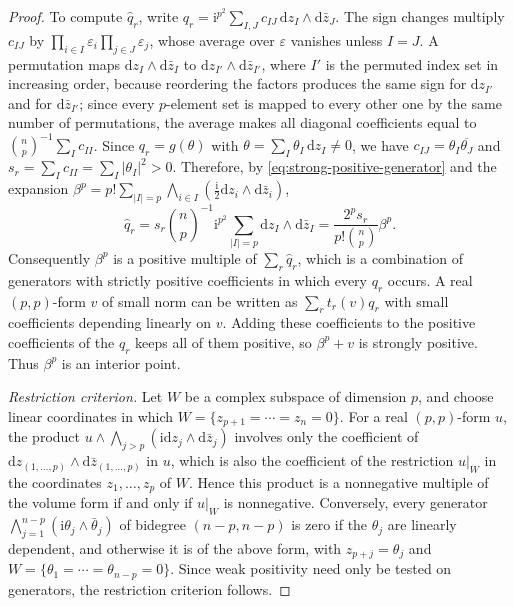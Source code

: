 \begin{proof}
To compute $\widehat q_r$, write $q_r=\mathrm i^{p^2}\sum_{I,J}c_{IJ}\,\mathrm dz_I\wedge\mathrm d\bar z_J$. The sign changes multiply $c_{IJ}$ by $\prod_{i\in I}\varepsilon_i\prod_{j\in J}\varepsilon_j$, whose average over $\varepsilon$ vanishes unless $I=J$. A permutation maps $\mathrm dz_I\wedge\mathrm d\bar z_I$ to $\mathrm dz_{I'}\wedge\mathrm d\bar z_{I'}$, where $I'$ is the permuted index set in increasing order, because reordering the factors produces the same sign for $\mathrm dz_{I'}$ and for $\mathrm d\bar z_{I'}$; since every $p$-element set is mapped to every other one by the same number of permutations, the average makes all diagonal coefficients equal to $\binom np^{-1}\sum_Ic_{II}$. Since $q_r=g(\theta)$ with $\theta=\sum_I\theta_I\,\mathrm dz_I\neq0$, we have $c_{IJ}=\theta_I\overline{\theta_J}$ and $s_r=\sum_Ic_{II}=\sum_I|\theta_I|^2>0$. Therefore, by \eqref{eq:strong-positive-generator} and the expansion $\beta^p=p!\sum_{|I|=p}\bigwedge_{i\in I}(\frac{\mathrm i}2\mathrm dz_i\wedge\mathrm d\bar z_i)$,
\[
 \widehat q_r=s_r\binom np^{-1}\mathrm{i}^{p^2}\sum_{|I|=p}\mathrm{d}z_I\wedge\mathrm{d}\bar z_I
 =\frac{2^ps_r}{p!\binom np}\beta^p.
\]
Consequently $\beta^p$ is a positive multiple of $\sum_r\widehat q_r$, which is a combination of generators with strictly positive coefficients in which every $q_r$ occurs. A real $(p,p)$-form $v$ of small norm can be written as $\sum_rt_r(v)q_r$ with small coefficients depending linearly on $v$. Adding these coefficients to the positive coefficients of the $q_r$ keeps all of them positive, so $\beta^p+v$ is strongly positive. Thus $\beta^p$ is an interior point.

\emph{Restriction criterion.} Let $W$ be a complex subspace of dimension $p$, and choose linear coordinates in which $W=\{z_{p+1}=\cdots=z_n=0\}$. For a real $(p,p)$-form $u$, the product $u\wedge\bigwedge_{j>p}(\mathrm{i}\mathrm{d}z_j\wedge\mathrm{d}\bar z_j)$ involves only the coefficient of $\mathrm dz_{(1,\ldots,p)}\wedge\mathrm d\bar z_{(1,\ldots,p)}$ in $u$, which is also the coefficient of the restriction $u|_W$ in the coordinates $z_1,\ldots,z_p$ of $W$. Hence this product is a nonnegative multiple of the volume form if and only if $u|_W$ is nonnegative. Conversely, every generator $\bigwedge_{j=1}^{n-p}(\mathrm{i}\theta_j\wedge\bar\theta_j)$ of bidegree $(n-p,n-p)$ is zero if the $\theta_j$ are linearly dependent, and otherwise it is of the above form, with $z_{p+j}=\theta_j$ and $W=\{\theta_1=\cdots=\theta_{n-p}=0\}$. Since weak positivity need only be tested on generators, the restriction criterion follows.


\end{proof}
